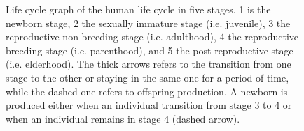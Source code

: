 \documentclass{article}
\begin{document}
\begin{figure}[H]
    \centering
\caption{Life cycle graph of the human life cycle in five stages. 1 is the newborn stage, 2 the sexually immature stage (i.e. juvenile), 3 the reproductive non-breeding stage (i.e. adulthood), 4 the reproductive breeding stage (i.e. parenthood), and 5 the post-reproductive stage (i.e. elderhood). The thick arrows refers to the transition from one stage to the other or staying in the same one for a period of time, while the dashed one refers to offspring production. A newborn is produced either when an individual transition from stage 3 to 4 or when an individual remains in stage 4 (dashed arrow).}
    \label{fig:1}
\end{figure}
\end{document}

